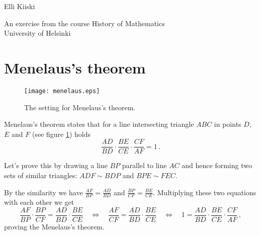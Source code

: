 \documentclass{article}
\begin{document}
{\large
Elli Kiiski
\par
An exercise from the course History of Mathematics\\University of Helsinki
}
\vspace{0.5cm}

\section*{Menelaus's theorem}

\begin{figure}[!htb]
    \centering
    \texttt{[image: menelaus.eps]}
    \caption{The setting for Menelaus's theorem.}
    \label{fig:menelaus}
\end{figure}

Menelaus's theorem states that for a line intersecting triangle $ABC$ in points $D$, $E$ and $F$ (see figure \ref{fig:menelaus}) holds
\begin{equation*}
    \frac{AD}{BD}\cdot\frac{BE}{CE}\cdot\frac{CF}{AF}=1\,.
\end{equation*}

Let's prove this by drawing a line $BP$ parallel to line $AC$ and hence forming two sets of similar triangles: $ADF \sim BDP$ and $BPE \sim FEC$.

By the similarity we have $\frac{AF}{BP}=\frac{AD}{BD}$ and $\frac{BP}{CF}=\frac{BE}{CE}$. Multiplying these two equations with each other we get
\begin{equation*}
    \frac{AF}{BP}\cdot\frac{BP}{CF}=\frac{AD}{BD}\cdot\frac{BE}{CE} \quad \Leftrightarrow \quad \frac{AF}{CF}=\frac{AD}{BD}\cdot\frac{BE}{CE} \quad \Leftrightarrow \quad 1=\frac{AD}{BD}\cdot\frac{BE}{CE}\cdot\frac{CF}{AF}\,,
\end{equation*}
proving the Menelaus's theorem.
\end{document}
